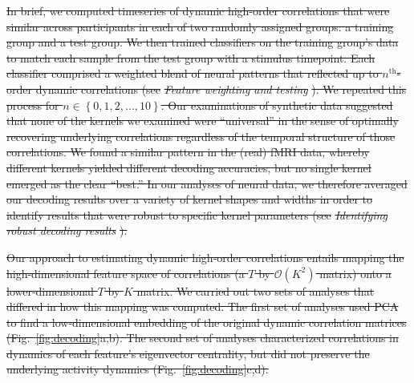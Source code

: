 \documentclass[english]{article}
\providecommand{\DIFdeltex}[1]{{\protect\color{red}\sout{#1}}}                      %
\providecommand{\DIFdel}[1]{\texorpdfstring{\DIFdeltex{#1}}{}} %
\begin{document}
\DIFdel{In brief, we computed timeseries of dynamic high-order correlations
that were similar across participants in each of two randomly assigned
groups: a training group and a test group.  We then trained
classifiers on the training group's data to match each sample from the
test group with a stimulus timepoint.  Each classifier comprised a
weighted blend of neural patterns that reflected up to
$n^\mathrm{th}$-order dynamic correlations (see }\textit{\DIFdel{Feature
  weighting and testing}}%
\DIFdel{).  We repeated this process for
$n \in \left\{ 0, 1, 2, ..., 10 \right\}$.  Our examinations of
synthetic data suggested that none of the kernels we examined were
``universal'' in the sense of optimally recovering underlying
correlations regardless of the temporal structure of those
correlations.  We found a similar pattern in the (real) fMRI data,
whereby different kernels yielded different decoding accuracies, but
no single kernel emerged as the clear ``best.''  In our analyses of
neural data, we therefore averaged our decoding results over a variety
of kernel shapes and widths in order to identify results that were
robust to specific kernel parameters (see }\textit{\DIFdel{Identifying robust
  decoding results}}%
\DIFdel{).
}%

\DIFdel{Our approach to estimating dynamic high-order correlations entails
mapping the high-dimensional feature space of correlations (a $T$ by
$\mathcal{O}(K^2)$ matrix) onto a lower-dimensional $T$ by $K$ matrix.
We carried out two sets of analyses that differed in how this mapping
was computed.  The first set of analyses used PCA to find a
low-dimensional embedding of the original dynamic correlation matrices
(Fig.~\ref{fig:decoding}a,b).  The second set of analyses
characterized correlations in dynamics of each feature's eigenvector
centrality, but did not preserve the underlying activity dynamics
(Fig.~\ref{fig:decoding}c,d).
}%
\end{document}
